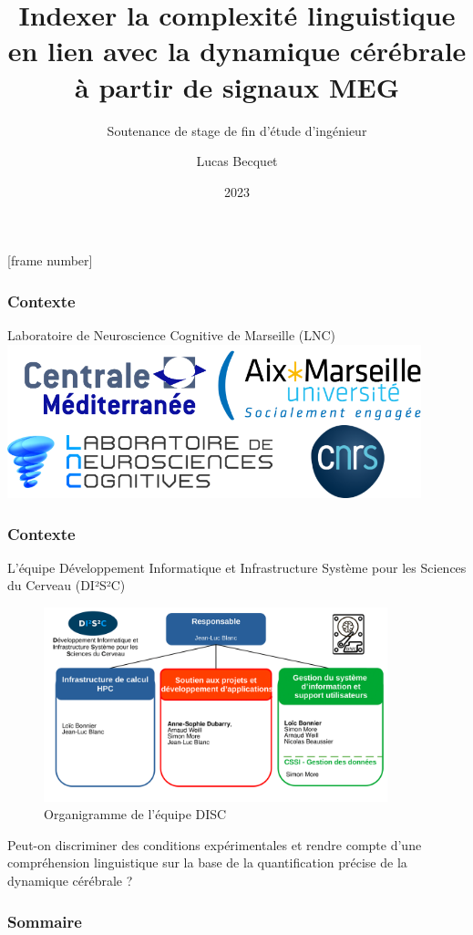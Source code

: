 \documentclass{beamer}
\title{Indexer la complexité linguistique en lien avec la dynamique cérébrale à partir de signaux MEG}
\subtitle{Soutenance de stage de fin d'étude d'ingénieur}
\author{Lucas Becquet}
\institute{Ecole Centrale de Marseille}
\date{2023}
\begin{document}
\frame{\titlepage}
[frame number]
\begin{frame}
\frametitle{Contexte}
Laboratoire de Neuroscience Cognitive de Marseille (LNC)
\center
\includegraphics[width=0.9\textwidth]{logos.png}
\end{frame}

\begin{frame}
\frametitle{Contexte}
L'équipe Développement Informatique et Infrastructure Système pour les Sciences du Cerveau (DI²S²C)
\begin{figure}[!ht]
    \centering
    \includegraphics[width=10cm]{OrganigrameDISC.png}
    \caption{Organigramme de l'équipe DISC}
    \label{fig1}
\end{figure}
\end{frame}

\begin{frame}
Peut-on discriminer des conditions expérimentales et rendre compte d'une compréhension linguistique sur la base de la quantification précise de la dynamique cérébrale ?
\end{frame}

\begin{frame}
\frametitle{Sommaire}
\tableofcontents
\end{frame}

\AtBeginSection{
  \begin{frame}
    \tableofcontents[currentsection]
  \end{frame}
}

\AtBeginSubsection{
  \begin{frame}
    \tableofcontents[currentsubsection]
  \end{frame}
}
\end{document}
